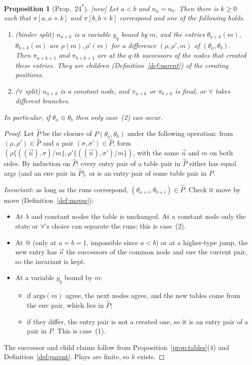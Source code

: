 \documentclass[11pt]{article}
\newcommand{\iv}[2]{\pi[#1,#2]}
\newcommand{\args}{\mathrm{args}}
\newcommand{\New}{\textsf{[new]}}
\theoremstyle{plain}
\newtheorem{proposition}[theorem]{Proposition}
\theoremstyle{definition}
\theoremstyle{remark}
\begin{document}
\begin{proposition}[Prop.~24\textsuperscript{*}]\label{prop:24star}
\New{} Let $a<b$ and $n_a=n_b$.  Then there is $k\ge0$ such that
$\iv a{a+k}$ and $\iv b{b+k}$ correspond and one of the following
holds.
\begin{enumerate}
\item[(1)] \emph{(binder split)} $n_{a+k}$ is a variable $y_q$ bound by
  $m$, and the entries $\theta_{a+k}(m)$, $\theta_{b+k}(m)$ are
  $\rho(m),\rho'(m)$ for a difference $(\rho,\rho',m)$ of
  $(\theta_a,\theta_b)$.  Then $\pi_{a+k+1}$ and $\pi_{b+k+1}$ are at the
  $q$-th successors of the nodes that created these entries.  They are
  children (Definition~\ref{def:parent}) of the creating positions.
\item[(2)] \emph{($\forall$ split)} $n_{a+k}$ is a constant node, and
  $\pi_{a+k}$ or $\pi_{b+k}$ is final, or $\forall$ takes different
  branches.
\end{enumerate}
In particular, if $\theta_a\equiv\theta_b$ then only case~(2) can occur.
\end{proposition}
\begin{proof}
Let $\hat P$ be the closure of $P(\theta_a,\theta_b)$ under the
following operation: from $(\rho,\rho')\in\hat P$ and a pair
$(\sigma,\sigma')\in\hat P$, form
$(\rho\{((\vec n),\sigma)/m\},\rho'\{((\vec n),\sigma')/m\})$, with the
same $\vec n$ and $m$ on both sides.  By induction on $\hat P$: every
entry pair of a table pair in $\hat P$ either has equal args (and an env
pair in $\hat P$), or is an entry pair of some table pair in $P$.

\emph{Invariant:} as long as the runs correspond,
$(\theta_{a+i},\theta_{b+i})\in\hat P$.  Check it move by move
(Definition~\ref{def:moves}):
\begin{itemize}
\item At $\lambda$ and constant nodes the table is unchanged.  At a
  constant node only the state or $\forall$'s choice can separate the
  runs; this is case~(2).
\item At $@$ (only at $a=b=1$, impossible since $a<b$) or at a
  higher-type jump, the new entry has $\vec n$ the successors of the
  common node and env the current pair, so the invariant is kept.
\item At a variable $y_q$ bound by $m$:
  \begin{itemize}
  \item if $\args(m)$ agree, the next nodes agree, and the new tables
    come from the env pair, which lies in $\hat P$;
  \item if they differ, the entry pair is not a created one, so it is
    an entry pair of a pair in $P$.  This is case~(1).
  \end{itemize}
\end{itemize}
The successor and child claims follow from
Proposition~\ref{prop:tables}(4) and Definition~\ref{def:parent}.
Plays are finite, so $k$ exists.
\end{proof}
\end{document}
